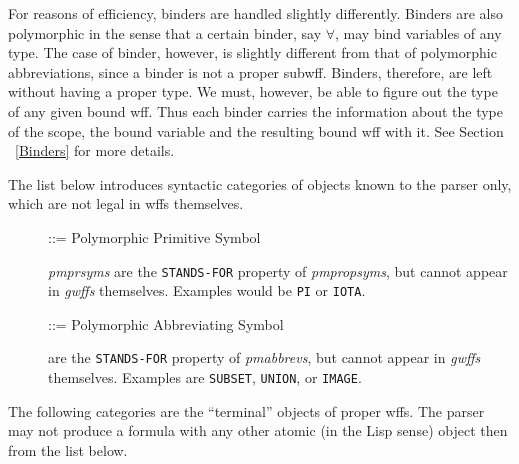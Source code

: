 For reasons of efficiency, binders are handled slightly differently.
Binders are also polymorphic in the sense that a certain binder, say
$\forall$, may bind variables of any type.  The case of binder, however,
is slightly different from that of polymorphic abbreviations, since
a binder is not a proper subwff.   Binders, therefore, are left without
having a proper type.  We must, however, be able to figure out the type
of any given bound wff.  Thus each binder carries the information
about the type of the scope, the bound variable and the resulting bound
wff with it.  See Section ~\ref{Binders} for more details.

The list below introduces syntactic categories of objects known to the
parser only, which are not legal in wffs themselves.

\begin{description}
\item [ ] ::= Polymorphic Primitive Symbol

 {\it pmprsyms} are the {\tt STANDS-FOR} property of 
{\it pmpropsyms}, but cannot appear in {\it gwffs} themselves.  
Examples would be {\tt PI} or {\tt IOTA}.

\item [ ] ::= Polymorphic Abbreviating Symbol

  are the {\tt STANDS-FOR} property of 
{\it pmabbrevs}, but cannot appear in {\it gwffs} themselves. 
Examples are {\tt SUBSET}, {\tt UNION}, or {\tt IMAGE}.

\end{description}

The following categories are the ``terminal'' objects of proper wffs.
The parser may not produce a formula with any other atomic (in the 
Lisp sense) object then from the list below.

